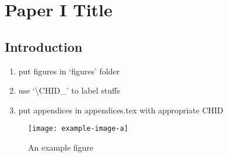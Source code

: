 \chapter{Paper I Title}\label{ch:\CHID}

	

\section{Introduction} \label{\CHID_sec:intro}
	\begin{enumerate}
		\item put figures in `figures' folder
		\item use `\textbackslash CHID\_' to label stuffs
		\item put appendices in appendices.tex with appropriate CHID
	\end{enumerate}
	\begin{figure}[h]
		\centering
		\texttt{[image: example-image-a]}
		\caption{An example figure}\label{\CHID_fig:exmple_image}
	\end{figure}